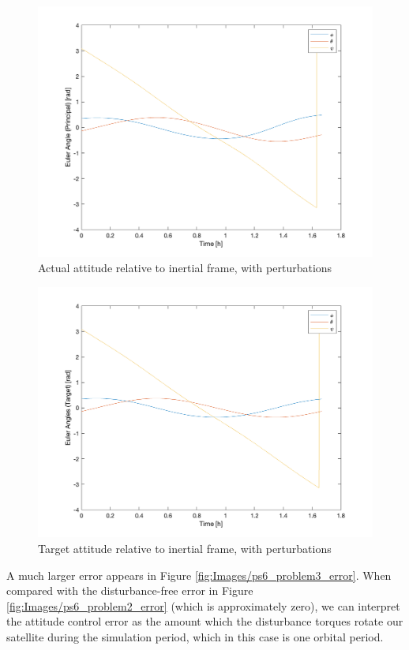 \begin{figure}[H]
\centering
\includegraphics[scale=0.6]{Images/ps6_problem3_principal.png}
\caption{Actual attitude relative to inertial frame, with perturbations}
\label{fig:Images/ps6_problem3_principal}
\end{figure}

\begin{figure}[H]
\centering
\includegraphics[scale=0.6]{Images/ps6_problem3_target.png}
\caption{Target attitude relative to inertial frame, with perturbations}
\label{fig:Images/ps6_problem3_target}
\end{figure}

A much larger error appears in Figure \ref{fig:Images/ps6_problem3_error}. When compared with the disturbance-free error in Figure \ref{fig:Images/ps6_problem2_error} (which is approximately zero), we can interpret the attitude control error as the amount which the disturbance torques rotate our satellite during the simulation period, which in this case is one orbital period.


